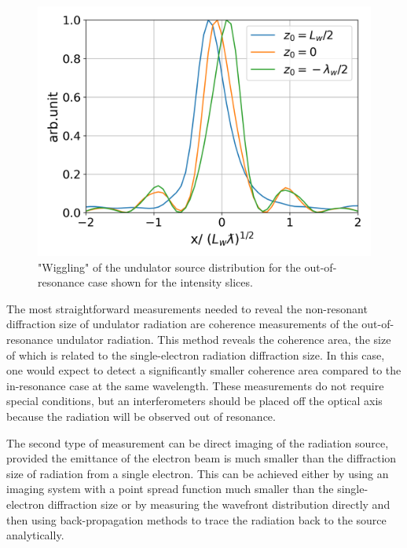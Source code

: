     \begin{figure}[h!]
        \centering
        \includegraphics[width=0.5\linewidth]{content/images/Synchrotron_Radiation/intensity_scan_N_w_10_out_of_resonance_slices.png}
        \captionsetup{justification=centering}
        \caption{"Wiggling" of the undulator source distribution for the out-of-resonance case shown for the intensity slices.}
        \label{Fig:intensity_scan_N_w_10_out_of_resonance_slices}
    \end{figure}
    The most straightforward measurements needed to reveal the non-resonant diffraction size of undulator radiation are coherence measurements of the out-of-resonance undulator radiation. This method reveals the coherence area, the size of which is related to the single-electron radiation diffraction size. In this case, one would expect to detect a significantly smaller coherence area compared to the in-resonance case at the same wavelength. These measurements do not require special conditions, but an interferometers should be placed off the optical axis because the radiation will be observed out of resonance. 
    
    
    The second type of measurement can be direct imaging of the radiation source, provided the emittance of the electron beam is much smaller than the diffraction size of radiation from a single electron. This can be achieved either by using an imaging system with a point spread function much smaller than the single-electron diffraction size or by measuring the wavefront distribution directly  and then using back-propagation methods to trace the radiation back to the source analytically.
    
    
